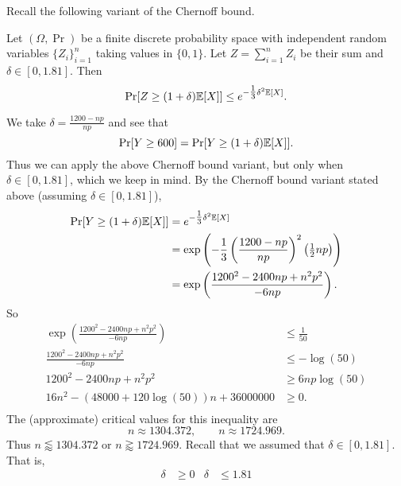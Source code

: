 \subpart\hspace{0em}
\begin{solution}
    Recall the following variant of the Chernoff bound.

    \vspace{0.5em}
    \begin{theorem}
        Let $(\Omega, \Pr)$ be a finite discrete probability space with independent random variables $\{Z_i\}_{i=1}^n$ taking values in $\{0,1\}$. Let $Z = \sum_{i=1}^n Z_i$ be their sum and $\delta \in [0, 1.81]$. Then
        \[ \Pr[Z \geq (1 + \delta)\mathbb E[X]] \leq e^{-\tfrac13 \delta^2 \mathbb E[X]}. \]
    \end{theorem}
    \vspace{0.5em}

    We take $\delta = \tfrac{1200-np}{np}$ and see that
    \[ \Pr[Y \geq 600] = \Pr[Y \geq (1 + \delta)\mathbb E[X]]. \]
    Thus we can apply the above Chernoff bound variant, but only when $\delta \in [0, 1.81]$, which we keep in mind. By the Chernoff bound variant stated above (assuming $\delta \in [0, 1.81]$),
    \begin{align*}
        \Pr[Y \geq (1 + \delta)\mathbb E[X]]
         & = e^{-\tfrac13 \delta^2 \mathbb E[X]}                                                        \\
         & = \exp\left(-\frac13 \left(\frac{1200-np}{np}\right)^2\left(\tfrac 12np\right)\right) \\
         & = \exp\left(\frac{1200^2 - 2400np + n^2p^2}{-6np}\right).
    \end{align*}
    So
    \begin{align*}
        \exp\left(\frac{1200^2 - 2400np + n^2p^2}{-6np}\right) & \leq \frac{1}{50} \\
        \frac{1200^2 - 2400np + n^2p^2}{-6np}                  & \leq -\log(50)    \\
        1200^2 - 2400np + n^2p^2                               & \geq 6np \log(50) \\
        16n^2 - (48000 + 120\log(50))n + 36000000              & \geq 0.           \\
    \end{align*}
    The (approximate) critical values for this inequality are
    \[ n \approx 1304.372, \qquad n \approx 1724.969. \]
    Thus $n \lessapprox 1304.372$ or $n \gtrapprox 1724.969$. Recall that we assumed that $\delta \in [0,1.81]$. That is,
    \begin{align*}
        \delta             & \geq 0    & \delta              & \leq 1.81              \\

\end{align*}
\end{solution}

